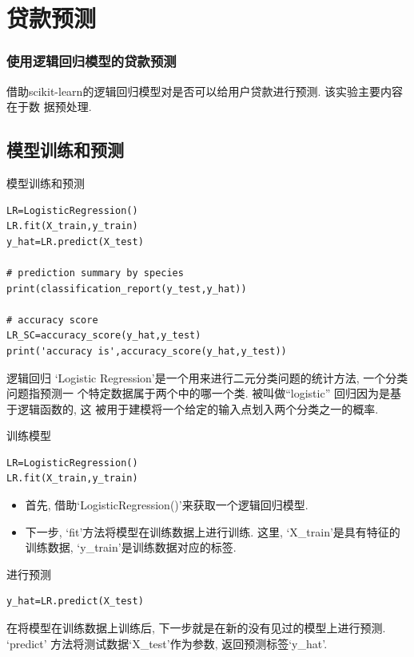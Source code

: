 \documentclass{beamer}
\begin{document}
\section{贷款预测}
\begin{frame}
	\frametitle{使用逻辑回归模型的贷款预测}

	借助scikit-learn的逻辑回归模型对是否可以给用户贷款进行预测. 该实验主要内容在于数
	据预处理.

\end{frame}

\subsection{模型训练和预测}
\begin{frame}[fragile]{模型训练和预测}
	\begin{verbatim}
LR=LogisticRegression()
LR.fit(X_train,y_train)
y_hat=LR.predict(X_test)

# prediction summary by species
print(classification_report(y_test,y_hat))

# accuracy score
LR_SC=accuracy_score(y_hat,y_test)
print('accuracy is',accuracy_score(y_hat,y_test))
\end{verbatim}
\end{frame}

\begin{frame}[fragile]{逻辑回归}
	`Logistic Regression'是一个用来进行二元分类问题的统计方法, 一个分类问题指预测一
	个特定数据属于两个中的哪一个类. 被叫做``logistic'' 回归因为是基于逻辑函数的, 这
	被用于建模将一个给定的输入点划入两个分类之一的概率.
\end{frame}

\begin{frame}[fragile]{训练模型}
	\begin{verbatim}
LR=LogisticRegression()
LR.fit(X_train,y_train)
\end{verbatim}
	\begin{itemize}
		\item 首先, 借助`LogisticRegression()'来获取一个逻辑回归模型.
		\item 下一步, `fit'方法将模型在训练数据上进行训练. 这里, `X\_train'是具有特征的
		      训练数据, `y\_train'是训练数据对应的标签.
	\end{itemize}
\end{frame}

\begin{frame}[fragile]{进行预测}
	\begin{verbatim}
y_hat=LR.predict(X_test)
	\end{verbatim}
	在将模型在训练数据上训练后, 下一步就是在新的没有见过的模型上进行预测. `predict'
	方法将测试数据`X\_test'作为参数, 返回预测标签`y\_hat'.
\end{frame}
\end{document}
